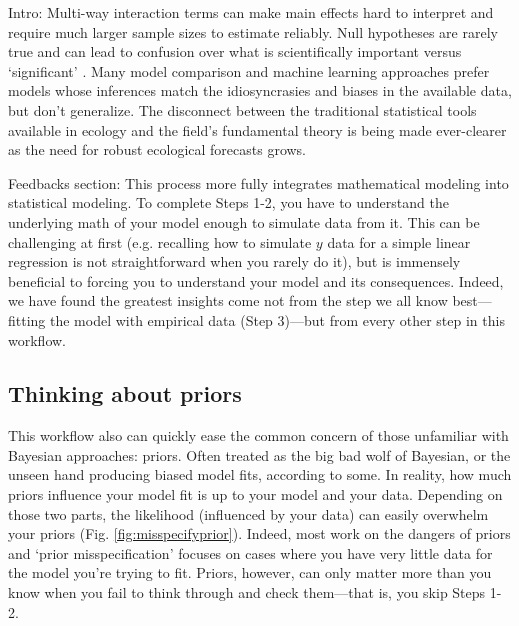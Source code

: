 
Intro:
Multi-way interaction terms can make main effects hard to interpret and require much larger sample sizes to estimate reliably. Null hypotheses are rarely true and can lead to confusion over what is scientifically important versus `significant' \citep{gelmanhill,muff2022rewriting}. Many model comparison and machine learning approaches prefer models whose inferences match the idiosyncrasies and biases in the available data, but don’t generalize.  The disconnect between the traditional statistical tools available in ecology and the field's fundamental theory is being made ever-clearer as the need for robust ecological forecasts grows. 

Feedbacks section:
This process more fully integrates mathematical modeling into statistical modeling. To complete Steps 1-2, you have to understand the underlying math of your model enough to simulate data from it. This can be challenging at first (e.g. recalling how to simulate $y$ data for a simple linear regression is not straightforward when you rarely do it), but is immensely beneficial to forcing you to understand your model and its consequences. Indeed, we have found the greatest insights come not from the step we all know best---fitting the model with empirical data (Step 3)---but from every other step in this workflow. %

 \subsection*{Thinking about priors} 
This workflow also can quickly ease the common concern of those unfamiliar with Bayesian approaches: priors. Often treated as the big bad wolf of Bayesian, or the unseen hand producing biased model fits, according to some. In reality, how much priors influence your model fit is up to your model and your data. Depending on those two parts, the likelihood (influenced by your data) can easily overwhelm your priors (Fig. \ref{fig:misspecifyprior}). Indeed, most work on the dangers of priors and `prior misspecification'  focuses on cases where you have very little data for the model you're trying to fit. Priors, however, can only matter more than you know when you fail to think through and check them---that is, you skip Steps 1-2. 

